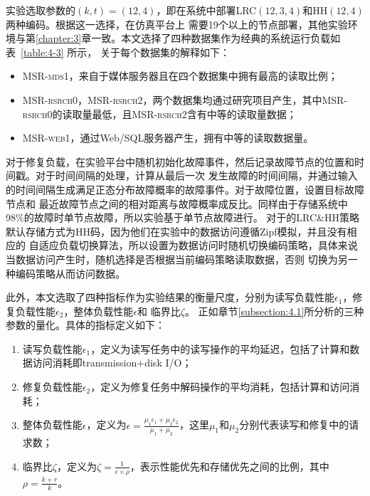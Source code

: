 实验选取参数的$(k,t)=(12,4)$，即在系统中部署LRC$(12,3,4)$和HH$(12,4)$两种编码。根据这一选择，在仿真平台上
需要19个以上的节点部署，其他实验环境与第\ref{chapter:3}章一致。本文选择了四种数据集\cite{narayanan2008write}作为经典的系统运行负载如表~\ref{table:4-3}
所示，
关于每个数据集的解释如下：

\begin{itemize}
	\item \textsc{MSR-mds1}，来自于媒体服务器且在四个数据集中拥有最高的读取比例；
	\item \textsc{MSR-rsrch0，MSR-rsrch2}，两个数据集均通过研究项目产生，其中\textsc{MSR-rsrch0}的读取量最低，且\textsc{MSR-rsrch2}含有中等的读取量数据；
	\item \textsc{MSR-web1}，通过Web/SQL服务器产生，拥有中等的读取数据量。
\end{itemize}



对于修复负载，在实验平台中随机初始化故障事件，然后记录故障节点的位置和时间戳。对于时间间隔的处理，计算从最后一次
发生故障的时间间隔，并通过输入的时间间隔生成满足正态分布故障概率的故障事件。对于故障位置，设置目标故障节点和
最近故障节点之间的相对距离与故障概率成反比。同样由于存储系统中98\%的故障时单节点故障\cite{xia2015tale}，所以实验基于单节点故障进行。
对于\citet{wang2020adaptive}的LRC\&HH策略默认存储方式为HH码，因为他们在实验中的数据访问遵循Zipf模拟，并且没有相应的
自适应负载切换算法，所以设置为数据访问时随机切换编码策略，具体来说当数据访问产生时，随机选择是否根据当前编码策略读取数据，否则
切换为另一种编码策略从而访问数据。

此外，本文选取了四种指标作为实验结果的衡量尺度，分别为读写负载性能$\epsilon_1$，修复负载性能$\epsilon_2$，整体负载性能$\epsilon$和
临界比$\zeta$。
正如章节\ref{subsection:4.1}所分析的三种
参数的量化。具体的指标定义如下：
\begin{enumerate}
	\item 读写负载性能$\epsilon_1$，定义为读写任务中的读写操作的平均延迟，包括了计算和数据访问消耗即transmission+disk I/O；
	\item 修复负载性能$\epsilon_2$，定义为修复任务中解码操作的平均消耗，包括计算和访问消耗；
	\item 整体负载性能$\epsilon$，定义为$\epsilon=\frac{\mu_1\epsilon_1 + \mu_2\epsilon_2}{\mu_1 + \mu_2}$，这里$\mu_1$和$\mu_2$分别代表读写和修复中的请求数；
	\item 临界比$\zeta$，定义为$\zeta = \frac{1}{\epsilon \times \rho}$，表示性能优先和存储优先之间的比例，其中$\rho = \frac{k+r}{k}$。
\end{enumerate}

